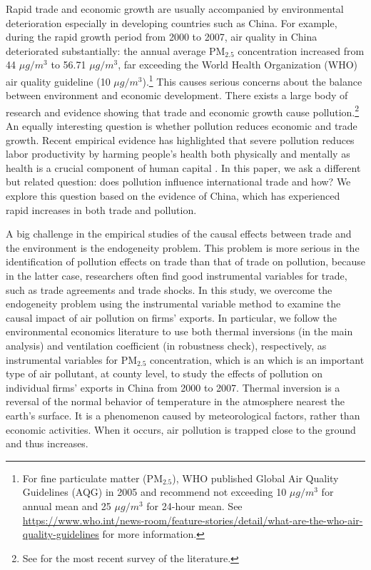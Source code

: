 \documentclass[12pt]{article}
\begin{document}
\label{sec:1} Rapid trade and economic growth are usually accompanied by
environmental deterioration especially in developing countries such as
China. For example, during the rapid growth period from 2000 to 2007, air quality in China deteriorated substantially:
 the annual average $\mathrm{PM_{2.5}}$
concentration increased from 44 $\mu g/m^{3}$ to 56.71 $\mu g/m^{3}$, far exceeding the World Health Organization
(WHO) air quality
guideline (10 $\mu g/m^{3}$).\footnote{%
For fine particulate matter ($\mathrm{PM_{2.5}}$), WHO published Global Air Quality Guidelines (AQG) in 2005 and recommend not exceeding 10 $\mu g/m^{3}$ for annual mean and 25 $\mu g/m^{3}$ for 24-hour mean.
See %
\url{https://www.who.int/news-room/feature-stories/detail/what-are-the-who-air-quality-guidelines}
for more information.} This causes serious
concerns about the balance between environment and economic development. There exists
a large body of research and evidence showing that trade and economic growth cause
pollution.\footnote{%
See \cite{cherniwchan2017trade} for the most recent survey of the literature.%
} An equally interesting question is whether pollution reduces economic and
trade growth. Recent empirical evidence has highlighted that severe pollution
reduces labor productivity by harming people's health both
physically and mentally as health is a crucial component of human capital %
\citep{graff2012impact,chang2016particulate,zhang2018impact,fu2021air,somanathan2021impact,adhvaryu2022management}%
. In this paper, we ask a different but related question: does pollution
influence international trade and how? We explore this question based on the
evidence of China, which has experienced rapid increases in both trade and
pollution.

A big challenge in the empirical studies of the causal effects between trade and the environment
is the endogeneity problem. This problem is more serious in
the identification of pollution effects on trade than that of trade on
pollution, because in the latter case, researchers often find good
instrumental variables for trade, such as trade agreements and trade shocks.
In this study, we overcome the endogeneity problem using the instrumental
variable method to examine the causal impact of air pollution on firms'
exports. In particular, we follow the environmental economics literature 
\citep[e.g.,][]{fu2021air,
fu2021trans,NBERw28401,chen2022effect} to use both thermal inversions (in
the main analysis) and ventilation coefficient (in robustness check), respectively,
as instrumental variables for $\mathrm{PM_{2.5}}$ concentration, which is an which is an
important type of air pollutant, at county level, to study the effects of
pollution on individual firms' exports in China from 2000 to 2007. Thermal
inversion is a reversal of the normal behavior of temperature in the
atmosphere nearest the earth's surface. It is a phenomenon caused by
meteorological factors, rather than economic activities. When it occurs, air
pollution is trapped close to the ground and thus increases.
\end{document}
